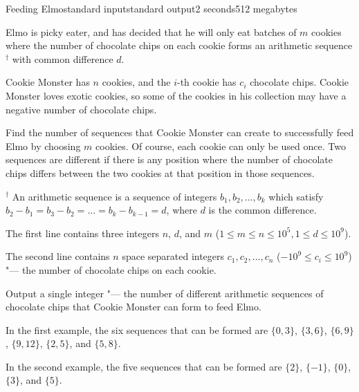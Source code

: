 \begin{problem}{Feeding Elmo}{standard input}{standard output}{2 seconds}{512 megabytes}

Elmo is picky eater, and has decided that he will only eat batches of $m$ cookies where the number of chocolate chips on each cookie forms an arithmetic sequence$^\dagger$ with common difference $d$. 

Cookie Monster has $n$ cookies, and the $i$-th cookie has $c_i$ chocolate chips. Cookie Monster loves exotic cookies, so some of the cookies in his collection may have a negative number of chocolate chips. 

Find the number of sequences that Cookie Monster can create to successfully feed Elmo by choosing $m$ cookies. Of course, each cookie can only be used once. Two sequences are different if there is any position where the number of chocolate chips differs between the two cookies at that position in those sequences. 

$^\dagger$ An arithmetic sequence is a sequence of integers $b_1, b_2, \dots, b_k$ which satisfy $b_2 - b_1 = b_3 - b_2 = \ldots = b_k - b_{k-1} = d$, where $d$ is the common difference.

\InputFile
The first line contains three integers $n$, $d$, and $m$ ($1 \le m \le n \le 10^5, 1 \le d \le 10^9$).

The second line contains $n$ space separated integers $c_1, c_2, \ldots, c_n$ ($-10^9 \le c_i \le 10^9$) "--- the number of chocolate chips on each cookie.

\OutputFile
Output a single integer "--- the number of different arithmetic sequences of chocolate chips that Cookie Monster can form to feed Elmo.

\Examples

\begin{example}
%
%
\end{example}

\Note
In the first example, the six sequences that can be formed are $\{0,3\}$, $\{3,6\}$, $\{6,9\}$, $\{9,12\}$, $\{2,5\}$, and $\{5,8\}$.

In the second example, the five sequences that can be formed are $\{2\}$, $\{-1\}$, $\{0\}$, $\{3\}$, and $\{5\}$.

\end{problem}

